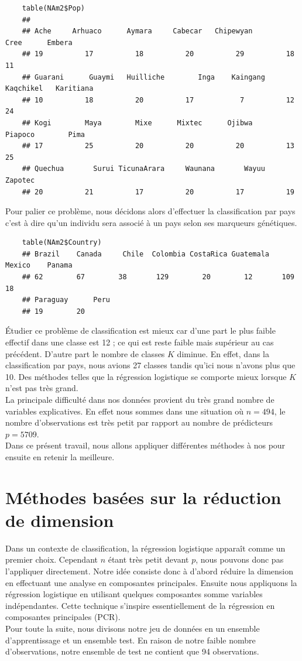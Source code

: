 \documentclass[12pt,a4paper]{article}
\begin{document}
\begin{lstlisting}
	table(NAm2$Pop)
	##
	## Ache     Arhuaco      Aymara     Cabecar   Chipewyan        Cree      Embera 
	## 19          17          18          20          29          18          11 
	## Guarani      Guaymi   Huilliche        Inga    Kaingang   Kaqchikel   Karitiana 
	## 10          18          20          17           7          12          24 
	## Kogi        Maya        Mixe      Mixtec      Ojibwa     Piapoco        Pima 
	## 17          25          20          20          20          13          25 
	## Quechua       Surui TicunaArara     Waunana       Wayuu     Zapotec 
	## 20          21          17          20          17          19 
\end{lstlisting}
Pour palier ce problème, nous décidons alors d'effectuer la classification
par pays c'est à dire qu'un individu sera associé à un pays selon ses marqueurs
génétiques.  
\vspace{2mm}
\begin{lstlisting}
	table(NAm2$Country)
	## Brazil    Canada     Chile  Colombia CostaRica Guatemala    Mexico    Panama 
	## 62        67        38       129        20        12       109        18 
	## Paraguay      Peru 
	## 19        20 
\end{lstlisting}
Étudier ce problème de classification est mieux car d'une part le plus
faible effectif dans une classe est 12 ; ce qui est reste faible mais supérieur
au cas précédent. D'autre part le nombre de classes $K$ diminue. En effet, dans
la classification par pays, nous avions 27 classes tandis qu'ici nous n'avons
plus que 10. Des méthodes telles que la régression logistique se comporte mieux
lorsque $K$ n'est pas très grand.\vspace{3mm}\\ La principale difficulté dans
nos données provient du très grand nombre de variables explicatives. En effet
nous sommes dans une situation où $n = 494$, le nombre d'observations est très
petit par rapport au nombre de prédicteurs $p=5709$.\\
Dans ce présent travail, nous allons appliquer différentes méthodes à nos pour
ensuite en retenir la meilleure.

\section{Méthodes basées sur la réduction de dimension}
Dans un contexte de classification, la régression logistique apparaît comme un
premier choix. Cependant $n$ étant très petit devant $p$, nous pouvons donc pas
l'appliquer directement. Notre idée consiste donc à d'abord réduire la
dimension en effectuant une analyse en composantes principales. Ensuite nous
appliquons la régression logistique en utilisant quelques composantes somme
variables indépendantes. Cette technique s'inspire essentiellement de la
régression en composantes principales (PCR).\vspace{2mm}\\ 
Pour toute la suite, nous divisons notre jeu de données en un ensemble
d'apprentissage et un ensemble test. En raison de notre faible nombre
d'observations, notre ensemble de test ne contient que 94
observations.\vspace{2mm}
\end{document}
